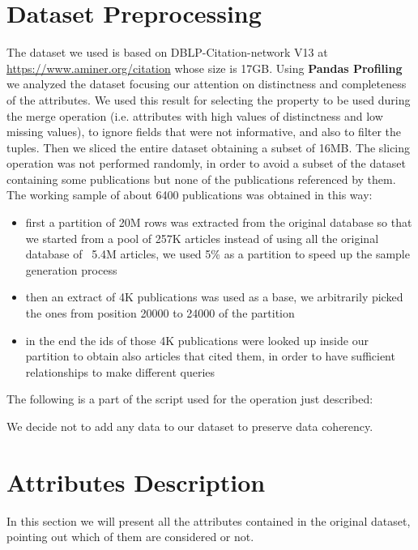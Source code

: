 \documentclass{Configuration_Files/PoliMi3i_thesis}
\begin{document}
\section{Dataset Preprocessing}
The dataset we used is based on DBLP-Citation-network V13 at \url{https://www.aminer.org/citation} whose size is 17GB. Using
\textbf{Pandas Profiling} we analyzed the dataset focusing our attention on distinctness and completeness of the attributes.
We used this result for selecting the property to be used during the merge operation (i.e. attributes with high values of distinctness
and low missing values), to ignore fields that were not informative, and also to filter the tuples. Then we sliced the entire
dataset obtaining a subset of 16MB. The slicing operation was not performed randomly, in order to avoid a subset of the
dataset containing some publications but none of the publications referenced by them. The working sample of about 6400 publications
was obtained in this way:
\begin{itemize}
    \item first a partition of 20M rows was extracted from the original database so that we started from a pool of 257K articles
        instead of using all the original database of ~5.4M articles, we used 5\% as a partition to speed up the sample generation
        process
    \item then an extract of 4K publications was used as a base, we arbitrarily picked the ones from position 20000 to 24000 of the partition
    \item in the end the ids of those 4K publications were looked up inside our partition to obtain also articles that cited
        them, in order to have sufficient relationships to make different queries
\end{itemize}
The following is a part of the script used for the operation just described:

\bigskip
We decide not to add any data to our dataset to preserve data coherency.

\section{Attributes Description}
In this section we will present all the attributes contained in the original dataset, pointing out which of them are considered or not.
\end{document}
